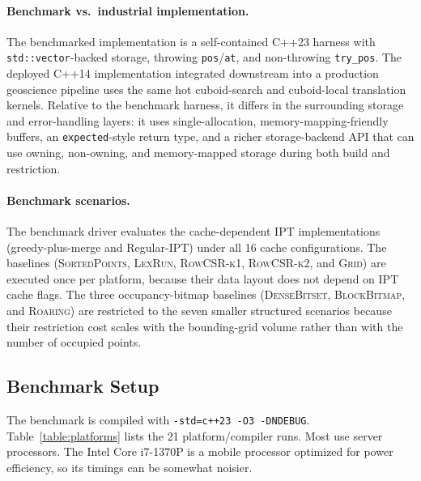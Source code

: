 \documentclass[manuscript,screen,review]{acmart}
\theoremstyle{definition}
\theoremstyle{plain}
\begin{document}
\paragraph{Benchmark vs.\ industrial implementation.}
The benchmarked implementation is a self-contained C++23 harness with
\texttt{std::vector}-backed storage, throwing \texttt{pos}/\texttt{at},
and non-throwing \texttt{try\_pos}. The deployed C++14 implementation
integrated downstream into a production geoscience pipeline uses the
same hot cuboid-search and cuboid-local translation kernels. Relative
to the benchmark harness, it differs in the surrounding storage and
error-handling layers: it uses
single-allocation, memory-mapping-friendly buffers, an
\texttt{expected}-style return type, and a richer storage-backend API
that can use owning, non-owning, and memory-mapped storage during both
build and restriction.

\paragraph{Benchmark scenarios.}
The benchmark driver evaluates the cache-dependent IPT implementations
(greedy-plus-merge and Regular-IPT) under all 16 cache configurations.
The baselines (\textsc{SortedPoints}, \textsc{LexRun},
\textsc{RowCSR-k1}, \textsc{RowCSR-k2}, and \textsc{Grid}) are
executed once per platform, because their data layout does not depend
on IPT cache flags.
The three occupancy-bitmap baselines (\textsc{DenseBitset},
\textsc{BlockBitmap}, and \textsc{Roaring}) are restricted to the
seven smaller structured scenarios because
their restriction cost scales with the bounding-grid volume rather than
with the number of occupied points.

\subsection{Benchmark Setup}
\label{section:setup}

The benchmark is compiled with \texttt{-std=c++23 -O3 -DNDEBUG}.
Table~\ref{table:platforms} lists the 21 platform/compiler runs. Most
use server processors. The Intel Core i7-1370P is a mobile processor
optimized for power efficiency, so its timings can be somewhat
noisier.
\end{document}
